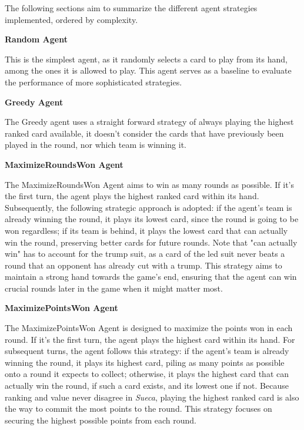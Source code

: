 \documentclass[sigconf]{acmart}
\begin{document}
\noindent The following sections aim to summarize the different agent strategies implemented, ordered by complexity.

{\centering\fontsize{11}{24}\selectfont\textbf{Random Agent}\par}
\vspace{2mm} %
This is the simplest agent, as it randomly selects a card to play from its hand, among the ones it is allowed to play. This agent serves as a baseline to evaluate the performance of more sophisticated strategies.

{\centering\fontsize{11}{24}\selectfont\textbf{Greedy Agent}\par}
\vspace{2mm} %
The Greedy agent uses a straight forward strategy of always playing the highest ranked card available, it doesn't consider the cards that have previously been played in the round, nor which team is winning it.

{\centering\fontsize{11}{24}\selectfont\textbf{MaximizeRoundsWon Agent}\par}
\vspace{2mm} %
The MaximizeRoundsWon Agent aims to win as many rounds as possible. If it's the first turn, the agent plays the highest ranked card within its hand. Subsequently, the following strategic approach is adopted: if the agent's team is already winning the round, it plays its lowest card, since the round is going to be won regardless; if its team is behind, it plays the lowest card that can actually win the round, preserving better cards for future rounds. Note that "can actually win" has to account for the trump suit, as a card of the led suit never beats a round that an opponent has already cut with a trump. This strategy aims to maintain a strong hand towards the game's end, ensuring that the agent can win crucial rounds later in the game when it might matter most.

{\centering\fontsize{11}{24}\selectfont\textbf{MaximizePointsWon Agent}\par}
\vspace{2mm} %
The MaximizePointsWon Agent is designed to maximize the points won in each round. If it's the first turn, the agent plays the highest card within its hand. For subsequent turns, the agent follows this strategy: if the agent's team is already winning the round, it plays its highest card, piling as many points as possible onto a round it expects to collect; otherwise, it plays the highest card that can actually win the round, if such a card exists, and its lowest one if not. Because ranking and value never disagree in \textit{Sueca}, playing the highest ranked card is also the way to commit the most points to the round. This strategy focuses on securing the highest possible points from each round.
\end{document}
